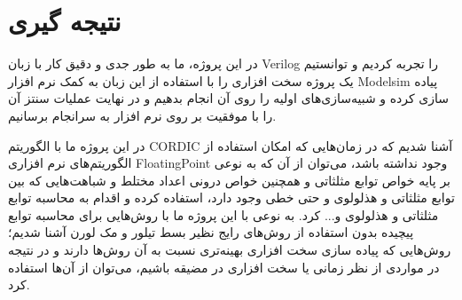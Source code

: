 \documentclass[12pt,titlepage,a4page , tikz , multi,table , svgnames,xcdraw]{article}
\begin{document}
\newpage

\section{نتیجه گیری}

در این پروژه، ما به طور جدی و دقیق کار با زبان Verilog را تجربه کردیم و توانستیم یک پروژه سخت افزاری را با استفاده از این زبان به کمک نرم افزار Modelsim پیاده سازی کرده و شبیه‌سازی‌های اولیه را روی آن انجام بدهیم و در نهایت عملیات سنتز آن را با موفقیت بر روی نرم افزار  به سرانجام برسانیم.

در این پروژه ما با الگوریتم CORDIC آشنا شدیم که در زمان‌هایی که امکان استفاده از الگوریتم‌های نرم افزاری FloatingPoint وجود نداشته باشد، می‌توان از آن که به نوعی بر پایه خواص توابع مثلثاتی و همچنین خواص درونی اعداد مختلط و شباهت‌هایی که بین توابع مثلثاتی و هذلولوی و حتی خطی وجود دارد، استفاده کرده و اقدام به محاسبه توابع مثلثاتی و هذلولوی و... کرد. به نوعی با این پروژه ما با روش‌هایی برای محاسبه توابع پیچیده بدون استفاده از روش‌های رایج نظیر بسط تیلور و مک لورن آشنا شدیم؛ روش‌هایی که پیاده سازی سخت افزاری بهینه‌تری نسبت به آن روش‌ها دارند و در نتیجه در مواردی از نظر زمانی یا سخت افزاری در مضیقه باشیم، می‌توان از آن‌ها استفاده کرد.



\newpage
\medskip




\end{document}
